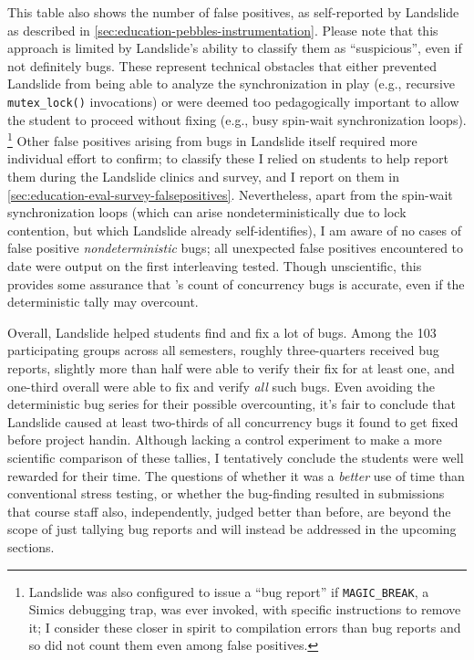This table also shows the number of false positives, as self-reported by Landslide
as described in \cref{sec:education-pebbles-instrumentation}.
Please note that this approach %
is limited by Landslide's ability to classify them as ``suspicious'', even if not definitely bugs.
These represent technical obstacles that either
prevented Landslide from being able to analyze the synchronization in play
(e.g., recursive {\tt mutex\_lock()} invocations)
or were deemed too pedagogically important to allow the student to proceed without fixing
(e.g., busy spin-wait synchronization loops).%
\footnote{
Landslide was also configured to issue a ``bug report''
if {\tt MAGIC\_BREAK}, a Simics debugging trap, was ever invoked,
with specific instructions to remove it;
I consider these closer in spirit to compilation errors than bug reports and so did not count them
even among false positives.
}
Other false positives arising from bugs in Landslide itself
required more individual effort to confirm;
to classify these I relied on students to help report them
during the Landslide clinics and survey,
and I report on them in \cref{sec:education-eval-survey-falsepositives}.
Nevertheless,
apart from the spin-wait synchronization loops
(which can arise nondeterministically due to lock contention, but which Landslide already self-identifies),
I am aware of no cases of false positive {\em nondeterministic} bugs;
all unexpected false positives encountered to date were output on the first interleaving tested.
Though unscientific,
this provides some assurance that 's count of concurrency bugs is accurate,
even if the deterministic tally may overcount.

Overall, Landslide helped students find and fix a lot of bugs.
Among the 103 participating groups across all semesters,
roughly three-quarters received bug reports,
slightly more than half were able to verify their fix for at least one,
and one-third overall were able to fix and verify {\em all} such bugs.
Even avoiding the deterministic bug series for their possible overcounting,
it's fair to conclude that Landslide caused at least two-thirds
of all concurrency bugs it found to get fixed before project handin.
Although lacking a control experiment to make a more scientific comparison of these tallies,
I tentatively conclude the students were well rewarded for their time.
The questions of whether it was a {\em better} use of time than conventional stress testing,
or whether the bug-finding resulted in submissions that course staff also, independently, judged better than before,
are beyond the scope of just tallying bug reports and will instead be addressed in the upcoming sections.

